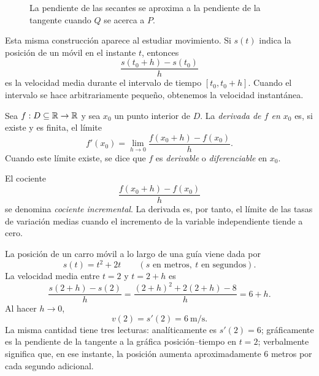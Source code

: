 \begin{figure}[htbp]
\centering
{}
\caption{La pendiente de las secantes se aproxima a la pendiente de la tangente cuando $Q$ se acerca a $P$.}
\label{fig:secante-tangente}
\end{figure}

Esta misma construcción aparece al estudiar movimiento. Si $s(t)$ indica la posición de un móvil en el instante $t$, entonces
\[
\frac{s(t_0+h)-s(t_0)}{h}
\]
es la velocidad media durante el intervalo de tiempo $[t_0,t_0+h]$. Cuando el intervalo se hace arbitrariamente pequeño, obtenemos la velocidad instantánea.

\begin{definition}
Sea $f:D\subseteq\mathbb{R}\to\mathbb{R}$ y sea $x_0$ un punto interior de $D$. La \emph{derivada de $f$ en $x_0$} es, si existe y es finita, el límite
\[
f'(x_0)=\lim_{h\to0}\frac{f(x_0+h)-f(x_0)}{h}.
\]
Cuando este límite existe, se dice que $f$ es \emph{derivable} o \emph{diferenciable} en $x_0$.
\end{definition}

El cociente
\[
\frac{f(x_0+h)-f(x_0)}{h}
\]
se denomina \emph{cociente incremental}. La derivada es, por tanto, el límite de las tasas de variación medias cuando el incremento de la variable independiente tiende a cero.

\begin{example}
La posición de un carro móvil a lo largo de una guía viene dada por
\[
s(t)=t^2+2t\qquad (s\text{ en metros},\ t\text{ en segundos}).
\]
La velocidad media entre $t=2$ y $t=2+h$ es
\[
\frac{s(2+h)-s(2)}{h}
=
\frac{(2+h)^2+2(2+h)-8}{h}
=
6+h.
\]
Al hacer $h\to0$,
\[
v(2)=s'(2)=6\ \mathrm{m/s}.
\]
La misma cantidad tiene tres lecturas: analíticamente es $s'(2)=6$; gráficamente es la pendiente de la tangente a la gráfica posición--tiempo en $t=2$; verbalmente significa que, en ese instante, la posición aumenta aproximadamente $6$ metros por cada segundo adicional.
\end{example}

